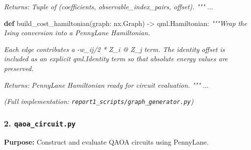 \documentclass[
  11pt,
]{report}
\newenvironment{Shaded}{}{}
\newcommand{\CommentTok}[1]{\textcolor[rgb]{0.38,0.63,0.69}{\textit{#1}}}
\newcommand{\KeywordTok}[1]{\textcolor[rgb]{0.00,0.44,0.13}{\textbf{#1}}}
\newcommand{\NormalTok}[1]{#1}
\newcommand{\OperatorTok}[1]{\textcolor[rgb]{0.40,0.40,0.40}{#1}}
\begin{document}
\begin{Shaded}
\begin{Highlighting}[]
\CommentTok{    Returns:}
\CommentTok{        Tuple of (coefficients, observable\_index\_pairs, offset).}
\CommentTok{    """}
\NormalTok{    ...}


\KeywordTok{def}\NormalTok{ build\_cost\_hamiltonian(graph: nx.Graph) }\OperatorTok{{-}\textgreater{}}\NormalTok{ qml.Hamiltonian:}
    \CommentTok{"""Wrap the Ising conversion into a PennyLane Hamiltonian.}

\CommentTok{    Each edge contributes a {-}w\_ij/2 * Z\_i @ Z\_j term. The identity}
\CommentTok{    offset is included as an explicit qml.Identity term so that}
\CommentTok{    absolute energy values are preserved.}

\CommentTok{    Returns:}
\CommentTok{        PennyLane Hamiltonian ready for circuit evaluation.}
\CommentTok{    """}
\NormalTok{    ...}
\end{Highlighting}
\end{Shaded}

\emph{(Full implementation:
\texttt{report1\_scripts/graph\_generator.py})}

\subsubsection{\texorpdfstring{2.
\texttt{qaoa\_circuit.py}}{2. qaoa\_circuit.py}}\label{qaoa_circuit.py}

\textbf{Purpose:} Construct and evaluate QAOA circuits using PennyLane.
\end{document}
